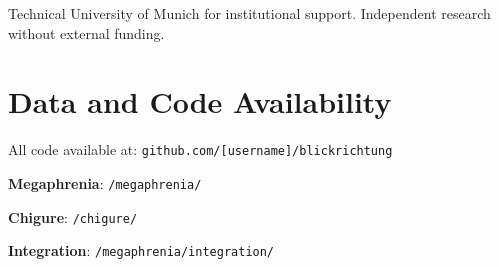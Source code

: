 \documentclass[12pt,twocolumn]{article}
\theoremstyle{remark}
\begin{document}
Technical University of Munich for institutional support. Independent research without external funding.

\section*{Data and Code Availability}

All code available at: \texttt{github.com/[username]/blickrichtung}

\textbf{Megaphrenia}: \texttt{/megaphrenia/}

\textbf{Chigure}: \texttt{/chigure/}

\textbf{Integration}: \texttt{/megaphrenia/integration/}



\end{document}
